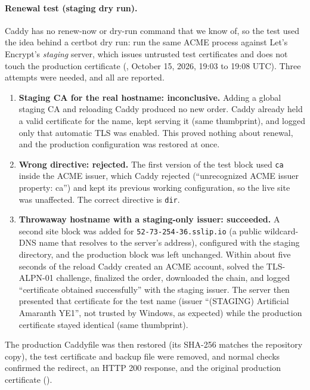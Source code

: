 \paragraph{Renewal test (staging dry run).}
Caddy has no renew-now or dry-run command that we know of, so the test used the
idea behind a certbot dry run: run the same ACME process against Let's
Encrypt's \emph{staging} server, which issues untrusted test certificates and
does not touch the production certificate (, October 15, 2026,
19:03 to 19:08 UTC). Three attempts were needed, and all are reported.
\begin{enumerate}[nosep]
  \item \textbf{Staging CA for the real hostname: inconclusive.} Adding a global staging CA and reloading Caddy produced no new order. Caddy already held a valid certificate for the name, kept serving it (same thumbprint), and logged only that automatic TLS was enabled. This proved nothing about renewal, and the production configuration was restored at once.
  \item \textbf{Wrong directive: rejected.} The first version of the test block used \texttt{ca} inside the ACME issuer, which Caddy rejected (``unrecognized ACME issuer property: ca'') and kept its previous working configuration, so the live site was unaffected. The correct directive is \texttt{dir}.
  \item \textbf{Throwaway hostname with a staging-only issuer: succeeded.} A second site block was added for \texttt{52-73-254-36.sslip.io} (a public wildcard-DNS name that resolves to the server's address), configured with the staging directory, and the production block was left unchanged. Within about five seconds of the reload Caddy created an ACME account, solved the TLS-ALPN-01 challenge, finalized the order, downloaded the chain, and logged ``certificate obtained successfully'' with the staging issuer. The server then presented that certificate for the test name (issuer ``(STAGING) Artificial Amaranth YE1'', not trusted by Windows, as expected) while the production certificate stayed identical (same thumbprint).
\end{enumerate}
The production Caddyfile was then restored (its SHA-256 matches the repository
copy), the test certificate and backup file were removed, and normal checks
confirmed the redirect, an HTTP 200 response, and the original production
certificate ().

\begin{longlisting}
\inputminted[fontsize=\scriptsize]{text}{evidence/42-caddy-acme-staging-issuance-test-2026-10-15.txt}
\caption{The staging dry run, with all three attempts, the restore, and the final checks, October 15, 2026, 19:03 to 19:08 UTC (real output; remote addresses masked).}
\label{Listing:E42}
\end{longlisting}

